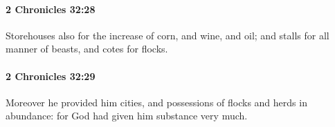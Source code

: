 		\paragraph{2 Chronicles 32:28} %
			\label{2CHRONICLES-32-28}

			Storehouses also for the increase of corn, and wine, and oil; and stalls for all manner of beasts, and cotes for flocks.


		\paragraph{2 Chronicles 32:29} %
			\label{2CHRONICLES-32-29}

			Moreover he provided him cities, and possessions of flocks and herds in abundance: for God had given him substance very much.


